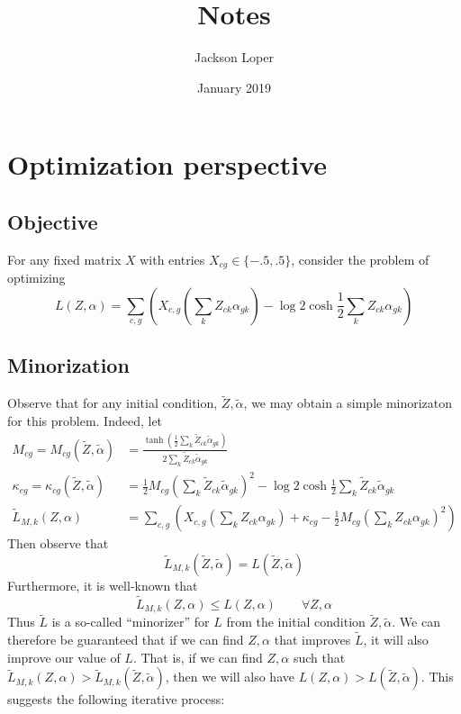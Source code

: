 \documentclass{article}
\begin{document}
\title{Notes}

\author{Jackson Loper}

\date{January 2019}

\maketitle

\section{Optimization perspective}

\subsection{Objective}

For any fixed matrix $X$ with entries $X_{cg}\in \{-.5,.5\}$, consider the problem of optimizing
\[
L(Z,\alpha) = \sum_{c,g} \left(X_{c,g}\left(\sum_k Z_{ck} \alpha_{gk}\right) - \log 2 \cosh \frac{1}{2}\sum_k Z_{ck} \alpha_{gk}\right)
\]

\subsection{Minorization}

Observe that for any initial condition, $\tilde Z,\tilde \alpha$, we may obtain a simple minorizaton for this problem.  Indeed, let
\begin{align*}
M_{cg}=M_{cg}(\tilde Z,\tilde \alpha) &=\frac{\tanh \left(\frac{1}{2}\sum_k \tilde Z_{ck} \tilde \alpha_{gk}\right)}{2\sum_k \tilde Z_{ck} \tilde \alpha_{gk}}\\
\kappa_{cg} = \kappa_{cg}(\tilde Z,\tilde \alpha) &=  \frac{1}{2}M_{cg}\left(\sum_k \tilde Z_{ck} \tilde \alpha_{gk}\right)^2 - \log 2 \cosh \frac{1}{2}\sum_k \tilde Z_{ck} \tilde \alpha_{gk}\\
\tilde L_{M,k}(Z,\alpha) &= \sum_{c,g} \left(X_{c,g}\left(\sum_k Z_{ck} \alpha_{gk}\right) + \kappa_{cg} - \frac{1}{2}M_{cg}\left(\sum_k Z_{ck} \alpha_{gk}\right)^2 \right)
\end{align*}
Then observe that
\[
\tilde L_{M,k}(\tilde Z,\tilde \alpha) = L(\tilde Z,\tilde \alpha)
\]
Furthermore, it is well-known that
\[
\tilde L_{M,k}(Z,\alpha) \leq L(Z,\alpha) \qquad \forall Z,\alpha
\]
Thus $\tilde L$ is a so-called ``minorizer'' for $L$ from the initial condition $\tilde Z,\tilde \alpha$.  We can therefore be guaranteed that if we can find $Z,\alpha$ that improves $\tilde L$, it will also improve our value of $L$.  That is, if we can find $Z,\alpha$ such that $\tilde L_{M,k}(Z,\alpha)>\tilde L_{M,k}(\tilde Z,\tilde \alpha)$, then we will also have $L(Z,\alpha)>L(\tilde Z,\tilde \alpha)$.  This suggests the following iterative process:
\end{document}
